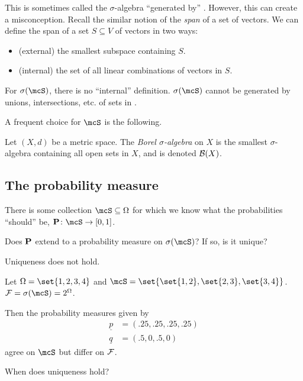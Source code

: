 This is sometimes called the $\sigma$-algebra ``generated by'' \mcS.
However, this can create a misconception.
Recall the similar notion of the \emph{span} of a set of vectors.
We can define the span of a set $S \subseteq V$ of vectors in two ways:
\begin{itemize}
    \item (external) the smallest subspace containing $S$.
    \item (internal) the set of all linear combinations of vectors in $S$.
\end{itemize}
For $\sigma(\mcS)$, there is no ``internal'' definition.
$\sigma(\mcS)$ cannot be generated by unions, intersections, etc. of sets in
\mcS.

A frequent choice for $\mcS$ is the following.
\begin{definition*} \label{def:borel}
    Let $(X, d)$ be a metric space.
    The \emph{Borel $\sigma$-algebra} on $X$ is the smallest
    $\sigma$-algebra containing all open sets in $X$, and is denoted
    $\B(X)$.
\end{definition*}

\subsection{The probability measure}
There is some collection $\mcS \subseteq \Omega$ for which we know what
the probabilities ``should'' be, $\P\colon \mcS \to [0, 1]$.

\begin{question}
    Does $\P$ extend to a probability measure on
    $\sigma(\mcS)$? If so, is it unique?
\end{question}

Uniqueness does not hold.
\begin{example}
    Let $\Omega = \set{1, 2, 3, 4}$ and
    $\mcS = \set{\set{1, 2}, \set{2, 3}, \set{3, 4}}$.
    $\F = \sigma(\mcS) = 2^\Omega$.

    Then the probability measures given by \begin{align*}
        \underline{p} &= (.25, .25, .25, .25) \\
        \underline{q} &= (.5, 0, .5, 0)
    \end{align*} agree on $\mcS$ but differ on $\F$.
\end{example}

When does uniqueness hold?
